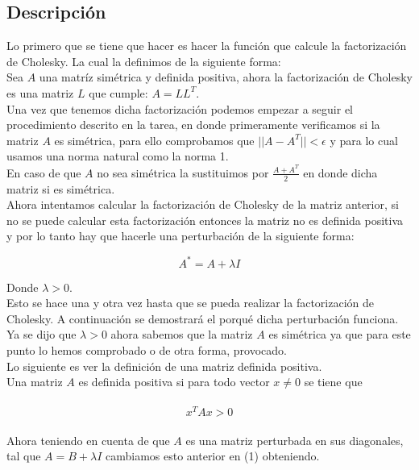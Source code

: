 \documentclass[12pt]{article}
\begin{document}
\subsection{Descripción}
Lo primero que se tiene que hacer es hacer la función que calcule la factorización de Cholesky. La cual la definimos de la siguiente forma:\\

Sea $A$ una matríz simétrica y definida positiva, ahora la factorización de Cholesky es una matriz $L$ que cumple: $A = LL^T$.\\

Una vez que tenemos dicha factorización podemos empezar a seguir el procedimiento descrito en la tarea, en donde primeramente verificamos si la matriz $A$ es simétrica, para ello comprobamos que $||A - A^T|| < \epsilon$ y para lo cual usamos una norma natural como la norma 1.\\
En caso de que $A$ no sea simétrica la sustituimos por $\frac{A + A^T}{2}$ en donde dicha matriz si es simétrica.\\
Ahora intentamos calcular la factorización de Cholesky de la matriz anterior, si no se puede calcular esta factorización entonces la matriz no es definida positiva y por lo tanto hay que hacerle una perturbación de la siguiente forma:

$$A^* = A + \lambda I$$

Donde $\lambda > 0$.\\
Esto se hace una y otra vez hasta que se pueda realizar la factorización de Cholesky. A continuación se demostrará el porqué dicha perturbación funciona.\\

Ya se dijo que $\lambda > 0$ ahora sabemos que la matriz $A$ es simétrica ya que para este punto lo hemos comprobado o de otra forma, provocado.\\
Lo siguiente es ver la definición de una matriz definida positiva.\\

Una matriz $A$ es definida positiva si para todo vector $x \neq 0$ se tiene que

\begin{align}
\label{eqn:eqlabel}
\begin{split}
x^T A x > 0
\end{split}
\end{align}

Ahora teniendo en cuenta de que $A$ es una matriz perturbada en sus diagonales, tal que $A = B + \lambda I$ cambiamos esto anterior en (1) obteniendo.
\end{document}
